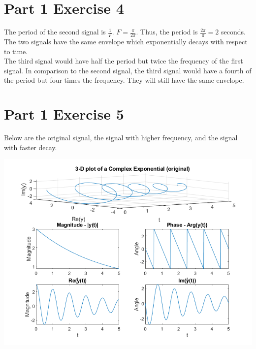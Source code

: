 \documentclass[11pt]{article}
\begin{document}


\pagebreak 
\section{Part 1 Exercise 4}

The period of the second signal is $\frac{1}{F}$. $F = \frac{\pi}{2 \pi}$. Thus, the period is $\frac{2\pi}{\pi} = 2$ seconds.\\

The two signals have the same envelope which exponentially decays with respect to time.\\

The third signal would have half the period but twice the frequency of the first signal. In comparison to the second signal, the third signal would have a fourth of the period but four times the frequency. They will still have the same envelope.

\pagebreak 
\section{Part 1 Exercise 5}

Below are the original signal, the signal with higher frequency, and the signal with faster decay.

\includegraphics[scale=0.7]{Exercise5_original.png}
\end{document}
